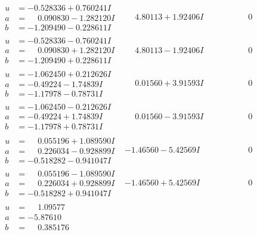 \documentclass[1p]{elsarticle_modified}
\theoremstyle{definition}
\begin{document}
$$\begin{array}{c|c|c}
\begin{aligned}
u &= -0.528336 + 0.760241 I \\
a &= \phantom{-}0.090830 - 1.282120 I \\
b &= -1.209490 - 0.228611 I\end{aligned}
 & \phantom{-}4.80113 + 1.92406 I & \phantom{-0.000000 } 0 \\ \hline\begin{aligned}
u &= -0.528336 - 0.760241 I \\
a &= \phantom{-}0.090830 + 1.282120 I \\
b &= -1.209490 + 0.228611 I\end{aligned}
 & \phantom{-}4.80113 - 1.92406 I & \phantom{-0.000000 } 0 \\ \hline\begin{aligned}
u &= -1.062450 + 0.212626 I \\
a &= -0.49224 - 1.74839 I \\
b &= -1.17978 - 0.78731 I\end{aligned}
 & \phantom{-}0.01560 + 3.91593 I & \phantom{-0.000000 } 0 \\ \hline\begin{aligned}
u &= -1.062450 - 0.212626 I \\
a &= -0.49224 + 1.74839 I \\
b &= -1.17978 + 0.78731 I\end{aligned}
 & \phantom{-}0.01560 - 3.91593 I & \phantom{-0.000000 } 0 \\ \hline\begin{aligned}
u &= \phantom{-}0.055196 + 1.089590 I \\
a &= \phantom{-}0.226034 - 0.928899 I \\
b &= -0.518282 - 0.941047 I\end{aligned}
 & -1.46560 - 5.42569 I & \phantom{-0.000000 } 0 \\ \hline\begin{aligned}
u &= \phantom{-}0.055196 - 1.089590 I \\
a &= \phantom{-}0.226034 + 0.928899 I \\
b &= -0.518282 + 0.941047 I\end{aligned}
 & -1.46560 + 5.42569 I & \phantom{-0.000000 } 0 \\ \hline\begin{aligned}
u &= \phantom{-}1.09577\phantom{ +0.000000I} \\
a &= -5.87610\phantom{ +0.000000I} \\
b &= \phantom{-}0.385176\phantom{ +0.000000I}\end{aligned}

\end{array}$$
\end{document}
